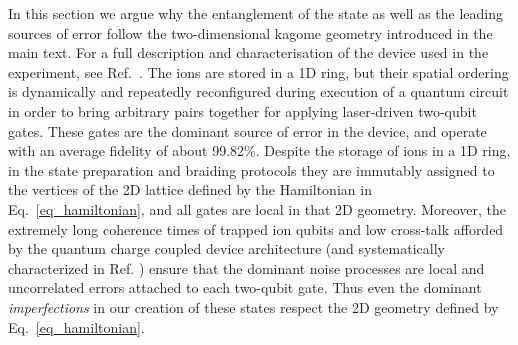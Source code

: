 \documentclass[nofootinbib,pra,twocolumn,showpacs,superscriptaddress,notitlepage,amsmath]{revtex4-2} %
\begin{document}
In this section we argue why the entanglement of the state as well as the leading sources of error follow the two-dimensional kagome geometry introduced in the main text. For a full description and characterisation of the device used in the experiment, see Ref.~\cite{moses2023race}. The ions are stored in a 1D ring, but their spatial ordering is dynamically and repeatedly reconfigured during execution of a quantum circuit in order to bring arbitrary pairs together for applying laser-driven two-qubit gates. These gates are the dominant source of error in the device, and operate with an average fidelity of about 99.82\%. Despite the storage of ions in a 1D ring, in the state preparation and braiding protocols they are immutably assigned to the vertices of the 2D lattice defined by the Hamiltonian in Eq.~\eqref{eq_hamiltonian}, and all gates are local in that 2D geometry. Moreover, the extremely long coherence times of trapped ion qubits and low cross-talk afforded by the quantum charge coupled device architecture (and systematically characterized in Ref. \cite{moses2023race}) ensure that the dominant noise processes are local and uncorrelated errors attached to each two-qubit gate. Thus even the dominant \emph{imperfections} in our creation of these states respect the 2D geometry defined by Eq.~\eqref{eq_hamiltonian}.
\end{document}
